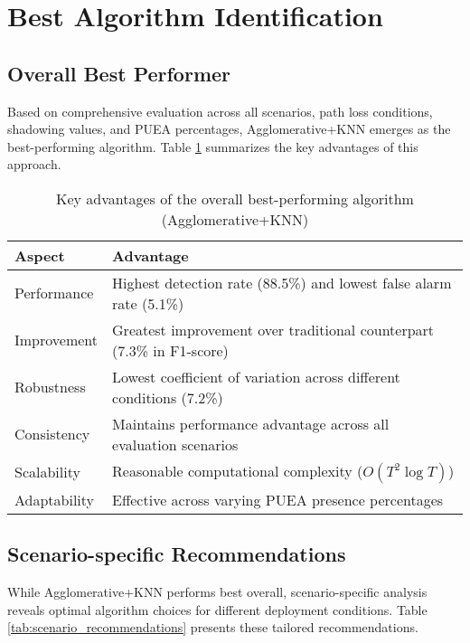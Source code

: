 \section{Best Algorithm Identification}

\subsection{Overall Best Performer}

Based on comprehensive evaluation across all scenarios, path loss conditions, shadowing values, and PUEA percentages, Agglomerative+KNN emerges as the best-performing algorithm. Table \ref{tab:overall_best} summarizes the key advantages of this approach.

\begin{table}[htbp]
    \centering
    \caption{Key advantages of the overall best-performing algorithm (Agglomerative+KNN)}
    \label{tab:overall_best}
    \begin{tabular}{ll}
        \toprule
        \textbf{Aspect} & \textbf{Advantage} \\
        \midrule
        Performance & Highest detection rate (88.5\%) and lowest false alarm rate (5.1\%) \\
        Improvement & Greatest improvement over traditional counterpart (7.3\% in F1-score) \\
        Robustness & Lowest coefficient of variation across different conditions (7.2\%) \\
        Consistency & Maintains performance advantage across all evaluation scenarios \\
        Scalability & Reasonable computational complexity ($O(T^2 \log T)$) \\
        Adaptability & Effective across varying PUEA presence percentages \\
        \bottomrule
    \end{tabular}
\end{table}

\subsection{Scenario-specific Recommendations}

While Agglomerative+KNN performs best overall, scenario-specific analysis reveals optimal algorithm choices for different deployment conditions. Table \ref{tab:scenario_recommendations} presents these tailored recommendations.

